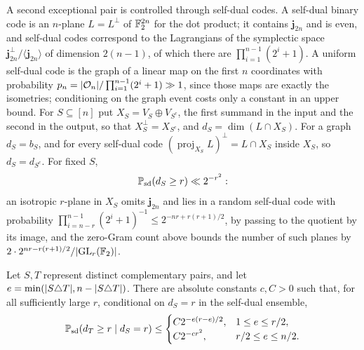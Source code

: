 A second exceptional pair is controlled through self-dual codes. A self-dual binary code is an
$n$-plane $L=L^\perp$ of $\mathbb{F}_2^{2n}$ for the dot product; it contains $\mathbf j_{2n}$ and is even,
and self-dual codes correspond to the Lagrangians of the symplectic space
$\mathbf j_{2n}^\perp/\langle\mathbf j_{2n}\rangle$ of dimension $2(n-1)$, of which there are
$\prod_{i=1}^{n-1}(2^i+1)$. A uniform self-dual code is the graph of a linear map on the first
$n$ coordinates with probability $p_n=\lvert\mathcal{O}_n\rvert/\prod_{i=1}^{n-1}(2^i+1)\gg1$, since those
maps are exactly the isometries; conditioning on the graph event costs only a constant in an
upper bound. For $S\subseteq[n]$ put $X_S=V_S\oplus V_{S^c}$, the first summand in the input and
the second in the output, so that $X_S^\perp=X_{S^c}$, and $d_S=\dim(L\cap X_S)$. For a graph
$d_S=b_S$, and for every self-dual code $(\operatorname{proj}_{X_S}L)^{\perp}=L\cap X_S$ inside
$X_S$, so $d_S=d_{S^c}$. For fixed $S$,
\begin{equation}\label{spn:eq:sdone}
 \mathbb{P}_{\mathrm{sd}}(d_S\ge r)\ll2^{-r^2}:
\end{equation}
an isotropic $r$-plane in $X_S$ omits $\mathbf j_{2n}$ and lies in a random self-dual code with
probability $\prod_{i=n-r}^{n-1}(2^i+1)^{-1}\le2^{-nr+r(r+1)/2}$, by passing to the quotient by
its image, and the zero-Gram count above bounds the number of such planes by
$2\cdot2^{nr-r(r+1)/2}/\lvert\operatorname{GL}_r(\mathbb{F}_2)\rvert$.

\begin{lemma}\label{spn:lem:twopairs}
Let $S,T$ represent distinct complementary pairs, and let
$e=\min(\lvert S\triangle T\rvert,n-\lvert S\triangle T\rvert)$. There are absolute constants $c,C>0$ such
that, for all sufficiently large $r$, conditional on $d_S=r$ in the self-dual ensemble,
\[
 \mathbb{P}_{\mathrm{sd}}(d_T\ge r\mid d_S=r)\le
 \begin{cases}C2^{-e(r-e)/2},&1\le e\le r/2,\\ C2^{-cr^2},&r/2\le e\le n/2.\end{cases}
\]
\end{lemma}

